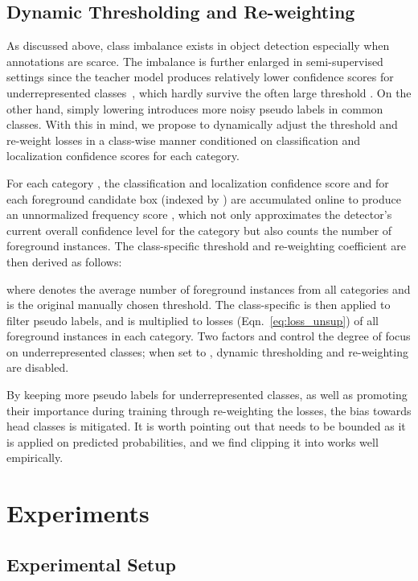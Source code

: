 \documentclass[letterpaper]{article} \usepackage{aaai22}  \usepackage{times}  \usepackage{helvet}  \usepackage{courier}  \usepackage[hyphens]{url}  \usepackage{graphicx} \urlstyle{rm} \def\UrlFont{\rm}  \usepackage{natbib}  \usepackage{caption} \DeclareCaptionStyle{ruled}{labelfont=normalfont,labelsep=colon,strut=off} \frenchspacing  \setlength{\pdfpagewidth}{8.5in}  \setlength{\pdfpageheight}{11in}  \usepackage{algorithm}
\begin{document}
\subsection{Dynamic Thresholding and Re-weighting} \label{sec:approach_dynamic}
As discussed above, class imbalance exists in object detection especially when annotations are scarce. The imbalance is further enlarged in semi-supervised settings since the teacher model produces relatively lower confidence scores for underrepresented classes~\cite{dave2021evaluating}, which hardly survive the often large threshold . On the other hand, simply lowering  introduces more noisy pseudo labels in common classes. With this in mind, we propose to dynamically adjust the threshold and re-weight losses in a class-wise manner conditioned on classification and localization confidence scores for each category.


For each category , the classification and localization confidence score  and  for each foreground candidate box (indexed by ) are accumulated online to produce an unnormalized frequency score , which not only approximates the detector's current overall confidence level for the category but also counts the number of foreground instances. The class-specific threshold  and re-weighting coefficient  are then derived as follows:
 
where  denotes the average number of foreground instances from all categories and  is the original manually chosen threshold. The class-specific  is then applied to filter pseudo labels, and  is multiplied to losses (Eqn.~\ref{eq:loss_unsup}) of all foreground instances in each category. Two factors  and  control the degree of focus on underrepresented classes; when set to , dynamic thresholding and re-weighting are disabled.

By keeping more pseudo labels for underrepresented classes, as well as promoting their importance during training through re-weighting the losses, the bias towards head classes is mitigated. It is worth pointing out that  needs to be bounded as it is applied on predicted probabilities, and we find clipping it into  works well empirically. 



\section{Experiments} \label{sec:exp}

\subsection{Experimental Setup} \label{sec:exp_setup}
\end{document}
